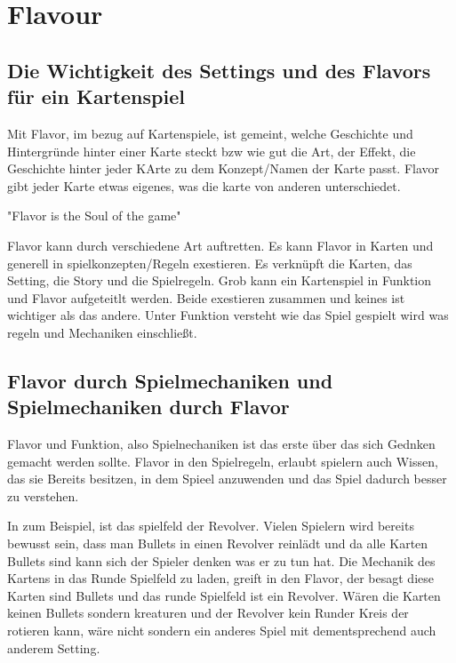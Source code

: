 
\section{Flavour}\label{sec:flavour}

\renewcommand{\kapitelautor}{Autor: Irgendwer} %

\subsection{Die Wichtigkeit des Settings und des Flavors für ein Kartenspiel}\label{subsec:wichtigkeit-des-flavours}

%
Mit Flavor, im bezug auf Kartenspiele, ist gemeint, welche Geschichte und Hintergründe hinter einer Karte steckt bzw wie gut die Art, der Effekt,
die Geschichte hinter jeder KArte zu dem Konzept/Namen der Karte passt. Flavor gibt jeder Karte etwas eigenes, was die karte von anderen unterschiedet.

"Flavor is the Soul of the game"\cite{soulOfTheGame}


Flavor kann durch verschiedene Art auftretten. Es kann Flavor in Karten und generell in spielkonzepten/Regeln exestieren.
Es verknüpft die Karten, das Setting, die Story und die Spielregeln. Grob kann ein Kartenspiel in Funktion und Flavor aufgeteitlt werden.
Beide exestieren zusammen und keines ist wichtiger als das andere. Unter Funktion versteht wie das Spiel gespielt wird was regeln und Mechaniken einschließt. \cite{flavorAndFunction}

%
\subsection{Flavor durch Spielmechaniken und Spielmechaniken durch Flavor}\label{subsec:flavour-durch-mechaniken}

Flavor und Funktion, also Spielnechaniken ist das erste über das sich Gednken gemacht werden sollte.
Flavor in den Spielregeln, erlaubt spielern auch Wissen, das sie Bereits besitzen, in dem Spieel anzuwenden und das Spiel dadurch besser zu verstehen. \cite{flavorAndFunction}

In \FF zum Beispiel, ist das spielfeld der Revolver. Vielen Spielern wird bereits bewusst sein, dass man Bullets in einen Revolver reinlädt und da alle Karten Bullets sind kann sich der Spieler
denken was er zu tun hat. Die Mechanik des Kartens in das Runde Spielfeld zu laden, greift in den Flavor, der besagt diese Karten sind Bullets und das runde Spielfeld ist ein Revolver.
Wären die Karten keinen Bullets sondern kreaturen und der Revolver kein Runder Kreis der rotieren kann, wäre \FF nicht \FF sondern ein anderes Spiel mit dementsprechend auch anderem Setting.

